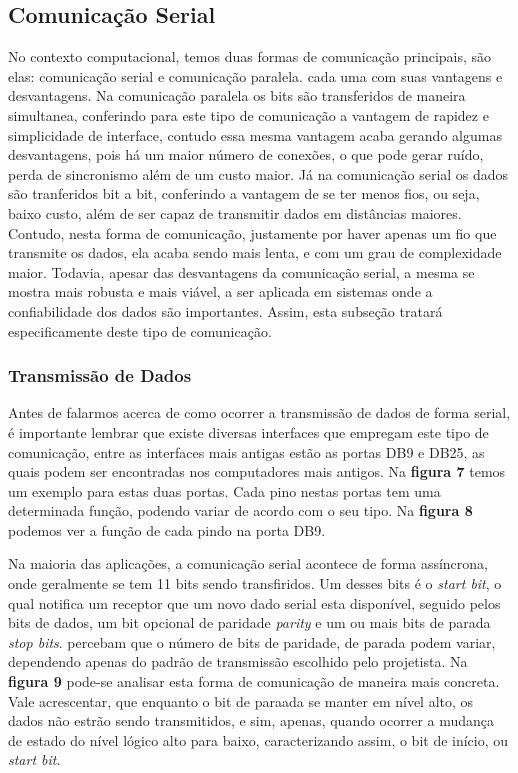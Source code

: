 \documentclass[12pt]{article}
\begin{document}
\subsection{Comunicação Serial}
No contexto computacional, temos duas formas de comunicação principais, são elas: comunicação serial e comunicação paralela. cada uma com suas vantagens e desvantagens. Na comunicação paralela os bits são transferidos de maneira simultanea, conferindo para este tipo de comunicação a vantagem de rapidez e simplicidade de interface, contudo essa mesma vantagem acaba gerando algumas desvantagens, pois há um maior número de conexões, o que pode gerar ruído, perda de sincronismo além de um custo maior. Já na comunicação serial os dados são tranferidos  bit a bit, conferindo a vantagem de se ter menos fios, ou seja, baixo custo, além de ser capaz de transmitir dados em distâncias maiores. Contudo, nesta forma de comunicação, justamente por haver apenas um fio que transmite os dados, ela acaba sendo mais lenta, e com um grau de complexidade maior. Todavia, apesar das desvantagens da comunicação serial, a mesma se mostra mais robusta e mais viável, a ser aplicada em sistemas onde a confiabilidade dos dados são importantes. Assim, esta subseção tratará especificamente deste tipo de comunicação. 

\subsubsection{Transmissão de Dados}
Antes de falarmos acerca de como ocorrer a transmissão de dados de forma serial, é importante lembrar que existe diversas interfaces que empregam este tipo de comunicação, entre as interfaces mais antigas estão as portas DB9 e DB25, as quais podem ser encontradas nos computadores mais antigos. Na \textbf{figura 7} temos um exemplo para estas duas portas. Cada pino nestas portas tem uma determinada função, podendo variar de acordo com o seu tipo. Na  \textbf{figura 8} podemos ver a função de cada pindo na porta DB9.


Na maioria das aplicações, a comunicação serial acontece de forma assíncrona, onde geralmente se tem 11 bits sendo transfiridos. Um desses bits é o \textit{start bit}, o qual notifica um receptor que um novo dado serial esta disponível, seguido pelos bits de dados, um bit opcional de paridade \textit{parity} e um ou mais bits de parada \textit{stop bits}. %
percebam que o número de bits de paridade, de parada podem variar, dependendo apenas do padrão de transmissão escolhido pelo projetista. Na \textbf{figura 9} pode-se analisar esta forma de comunicação de maneira mais concreta. Vale acrescentar, que enquanto o bit de paraada se manter em nível alto, os dados não estrão sendo transmitidos, e sim, apenas, quando ocorrer a mudança de estado do nível lógico alto para baixo, caracterizando assim, o bit de início, ou \textit{start bit}. 
\end{document}

